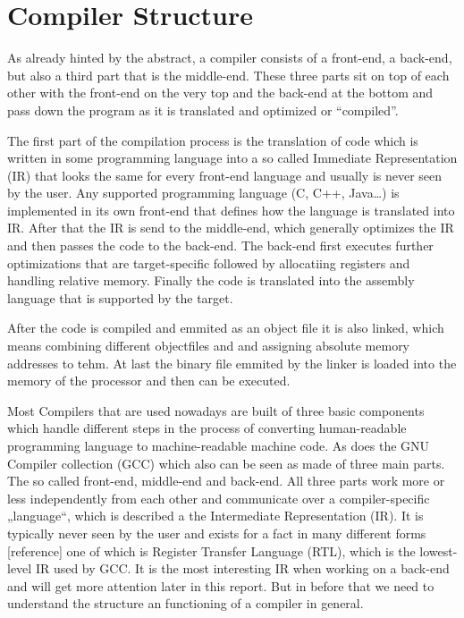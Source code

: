 \chapter{Compiler Structure}
\label{chapter:compiler structure}

As already hinted by the abstract, a compiler consists of a front-end, a back-end, but also a third part that is the middle-end.
These three parts sit on top of each other with the front-end on the very top and the back-end at the bottom and pass down the program as it is translated and optimized or ``compiled''.

The first part of the compilation process is the translation of code which is written in some programming language into a so called Immediate Representation (IR) that looks the same for every front-end language and usually is never seen by the user.
Any supported programming language (C, C++, Java…) is implemented in its own front-end that defines how the language is translated into IR.
After that the IR is send to the middle-end, which generally optimizes the IR and then passes the code to the back-end.
The back-end first executes further optimizations that are target-specific followed by allocatiing registers and handling relative memory.
Finally the code is translated into the assembly language that is supported by the target.

After the code is compiled and emmited as an object file it is also linked, which means combining different objectfiles and and assigning absolute memory addresses to tehm.
At last the binary file emmited by the linker is loaded into the memory of the processor and then can be executed.



Most Compilers that are used nowadays are built of three basic components which handle different steps in the process of converting human-readable programming language to machine-readable machine code.
As does the GNU Compiler collection (GCC) which also can be seen as made of three main parts.
The so called front-end, middle-end and back-end.
All three parts work more or less independently from each other and communicate over a compiler-specific „language“, which is described a the Intermediate Representation (IR).
It is typically never seen by the user and exists for a fact in many different forms [reference] one of which is Register Transfer Language (RTL), which is the lowest-level IR used by GCC.
It is the most interesting IR when working on a back-end and will get more attention later in this report.
But in before that we need to understand the structure an functioning of a compiler in general.

